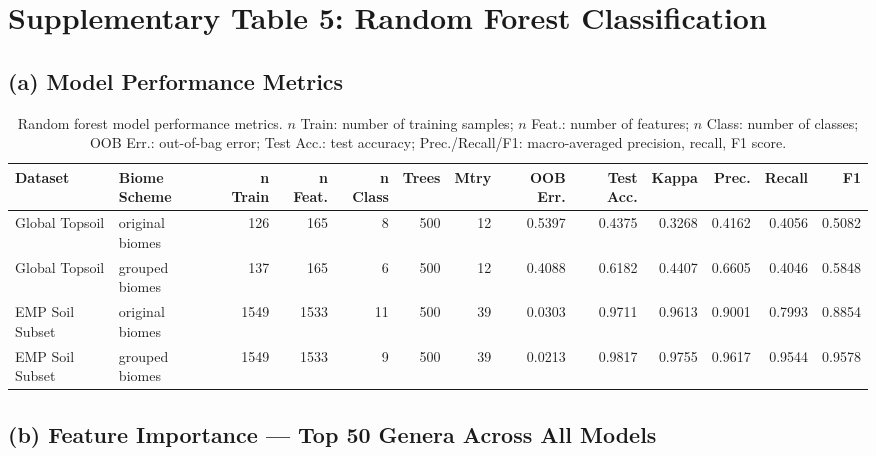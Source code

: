 \documentclass[12pt, oneside]{report}
\begin{document}
\section*{Supplementary Table 5: Random Forest Classification}
\label{supp:tab5}

\subsection*{(a) Model Performance Metrics}

\begin{table}[H]
\centering
\caption[RF model performance]{Random forest model performance metrics. $n$ Train: number of training samples; $n$ Feat.: number of features; $n$ Class: number of classes; OOB Err.: out-of-bag error; Test Acc.: test accuracy; Prec./Recall/F1: macro-averaged precision, recall, F1 score.}
\label{tab:supp6a}
\tiny
\begin{tabular}{llrrrrrrrrrrr}
\toprule
\textbf{Dataset} & \textbf{Biome Scheme} &
\textbf{n Train} & \textbf{n Feat.} & \textbf{n Class} &
\textbf{Trees} & \textbf{Mtry} &
\textbf{OOB Err.} & \textbf{Test Acc.} & \textbf{Kappa} &
\textbf{Prec.} & \textbf{Recall} & \textbf{F1} \\
\midrule
Global Topsoil & original biomes & 126 & 165 & 8 & 500 & 12 & 0.5397 & 0.4375 & 0.3268 & 0.4162 & 0.4056 & 0.5082 \\
Global Topsoil & grouped biomes & 137 & 165 & 6 & 500 & 12 & 0.4088 & 0.6182 & 0.4407 & 0.6605 & 0.4046 & 0.5848 \\
EMP Soil Subset & original biomes & 1549 & 1533 & 11 & 500 & 39 & 0.0303 & 0.9711 & 0.9613 & 0.9001 & 0.7993 & 0.8854 \\
EMP Soil Subset & grouped biomes & 1549 & 1533 & 9 & 500 & 39 & 0.0213 & 0.9817 & 0.9755 & 0.9617 & 0.9544 & 0.9578 \\
\bottomrule
\end{tabular}
\end{table}

\subsection*{(b) Feature Importance --- Top 50 Genera Across All Models}
\end{document}
